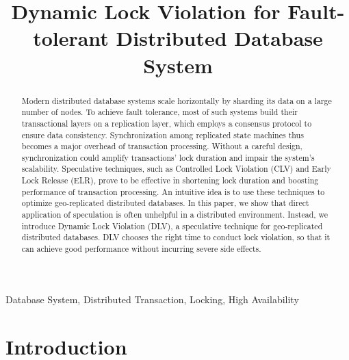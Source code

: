 \documentclass[conference]{IEEEtran}
\begin{document}
\title{Dynamic Lock Violation for Fault-tolerant Distributed Database System}


\author{
\and
{}
}

\maketitle

\begin{abstract}
Modern distributed database systems scale horizontally by sharding its data on a large number of nodes.
To achieve fault tolerance, most of such systems build their transactional layers on a replication layer,
which employs a consensus protocol to ensure data consistency.
Synchronization among replicated state machines thus becomes a major overhead of transaction processing.
Without a careful design, synchronization could amplify transactions' lock duration and impair the system's scalability.
Speculative techniques, such as Controlled Lock Violation (CLV) and Early Lock Release (ELR), prove to be effective in shortening lock duration and boosting performance of transaction processing.
An intuitive idea is to use these techniques to optimize geo-replicated distributed databases.
In this paper, we show that direct application of speculation is often unhelpful in a distributed environment.
Instead, we introduce Dynamic Lock Violation (DLV), a speculative technique for geo-replicated distributed databases.
DLV chooses the right time to conduct lock violation, so that it can achieve good performance without incurring severe side effects.
\end{abstract}

\begin{IEEEkeywords}
Database System, Distributed Transaction, Locking, High Availability
\end{IEEEkeywords}

\section{Introduction}
\end{document}
